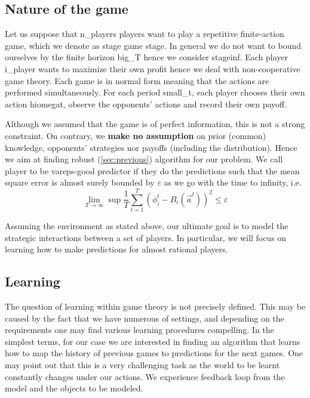 \documentclass[]{spie}  %
\begin{document}
\printglossaries

\subsection{Nature of the game}
\label{sec:setting}

Let us suppose that \gls{n_players} players want to play a repetitive finite-action game, which we denote as stage game \gls{stage}. In general we do not want to bound ourselves by the finite horizon \gls{big_T} hence we consider \gls{stageinf}. Each player \gls{i_player} wants to maximize their own profit hence we deal with non-cooperative game theory. Each game is in normal form meaning that the actions are performed simultaneously. For each period \gls{small_t}, each player chooses their own action \gls{hiomegat}, observe the opponents' actions and record their own payoff.

Although we assumed that the game is of perfect information, this is not a strong constraint. On contrary, we \textbf{make no assumption} on prior (common) knowledge, opponents' strategies nor payoffs (including the distribution). Hence we aim at finding robust (\autoref{sec:previous}) algorithm for our problem. We call player to be \gls{vareps}-good predictor if they do the predictions such that the mean square error is almost surely bounded by $\varepsilon$ as we go with the time to infinity, i.e.
$$ \lim_{T \to \infty} \sup \frac{1}{T} \sum_{t=1}^T (\phi_i^t - B_i(\overrightarrow{a}^t))^2 \leq \varepsilon$$

Assuming the environment as stated above, our ultimate goal is to model the strategic interactions between a set of players. In particular, we will focus on learning how to make predictions for almost rational players.

\subsection{Learning}
\label{sec:learning}
The question of learning within game theory is not precisely defined. This may be caused by the fact that we have numerous of settings, and depending on the requirements one may find various learning procedures compelling. In the simplest terms, for our case we are interested in finding an algorithm that learns how to map the history of previous games to predictions for the next games. One may point out that this is a very challenging task as the world to be learnt constantly changes under our actions. We experience feedback loop from the model and the objects to be modeled.
\end{document}
